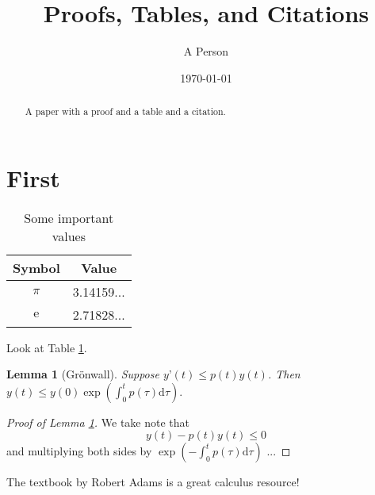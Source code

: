 \documentclass{article}
\title{Proofs, Tables, and Citations}
\date{\today}
\author{A Person}
\newtheorem{lemma}{Lemma}
\begin{document}
 
 \maketitle 
 
  \begin{abstract}
 A paper with a proof and a table and a citation.
 \end{abstract}
 
\section{First}

\begin{table}
\centering
\begin{tabular}{||c||c}
Symbol & Value \\
\hline \hline
$\pi$ & 3.14159... \\
\hline
$\mathrm{e}$ & 2.71828... \\
\hline
\end{tabular}
\caption{Some important values}
\label{tab:values}
\end{table}
Look at Table \ref{tab:values}.


 \begin{lemma}[Gr\"onwall]
 Suppose $y’(t) \leq p(t) y(t)$. Then
 $y(t) \leq y(0) \exp(\int_0^t p(\tau) \mathrm{d} \tau).$
 \label{lem:gron}
 \end{lemma}
 \begin{proof}[Proof of Lemma \ref{lem:gron}]
 We take note that $$y(t) - p(t) y(t) \leq 0$$ and
 multiplying both sides by $\exp(-\int_0^t p(\tau)
 \mathrm{d} \tau)$ ...
 \end{proof}

The textbook by Robert Adams \cite{adamsbook} is a great calculus resource!






 
\end{document}
